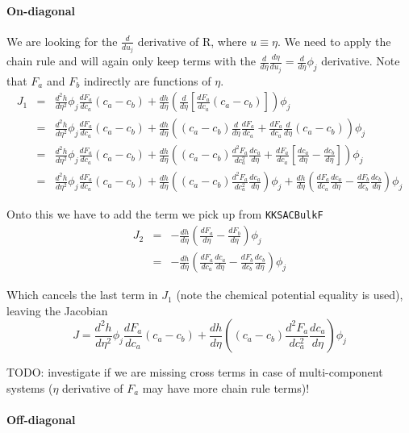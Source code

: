 \documentclass[]{article}
\begin{document}
\paragraph{On-diagonal}
We are looking for the $\frac d{du_j}$ derivative of R, where $u\equiv\eta$. We need to apply the chain rule and will again only keep terms with the $\frac{d}{d\eta}\frac{d\eta}{du_j}=\frac{d}{d\eta}\phi_j$ derivative. Note that $F_a$ and $F_b$ indirectly are functions of $\eta$.
\begin{eqnarray*}
J_1 &=& \frac{d^2h}{d\eta^2}\phi_j\frac{dF_a}{dc_a}(c_a-c_b) + \frac{dh}{d\eta}\left(\frac{d}{d\eta}\left[ \frac{dF_a}{dc_a}(c_a-c_b)\right]\right)\phi_j\\
&=& \frac{d^2h}{d\eta^2}\phi_j\frac{dF_a}{dc_a}(c_a-c_b) + \frac{dh}{d\eta}\left( (c_a-c_b)\frac{d}{d\eta}\frac{dF_a}{dc_a} + \frac{dF_a}{dc_a}\frac{d}{d\eta}(c_a-c_b) \right)\phi_j\\
&=& \frac{d^2h}{d\eta^2}\phi_j\frac{dF_a}{dc_a}(c_a-c_b) + \frac{dh}{d\eta}\left( (c_a-c_b)\frac{d^2F_a}{dc_a^2}\frac{dc_a}{d\eta} + \frac{dF_a}{dc_a}\left[\frac{dc_a}{d\eta}-\frac{dc_b}{d\eta}\right] \right)\phi_j\\
&=& \frac{d^2h}{d\eta^2}\phi_j\frac{dF_a}{dc_a}(c_a-c_b) + \frac{dh}{d\eta}\left( (c_a-c_b)\frac{d^2F_a}{dc_a^2}\frac{dc_a}{d\eta}\right)\phi_j + \frac{dh}{d\eta}\left(\frac{dF_a}{dc_a}\frac{dc_a}{d\eta}-\frac{dF_b}{dc_b}\frac{dc_b}{d\eta} \right)\phi_j
\end{eqnarray*}

Onto this we have to add the term we pick up from \texttt{KKSACBulkF}
\begin{eqnarray*}
J_2 &=& -\frac{dh}{d\eta}\left(\frac{dF_a}{d\eta}-\frac{dF_b}{d\eta}\right)\phi_j\\
&=&-\frac{dh}{d\eta}\left(\frac{dF_a}{dc_a}\frac{dc_a}{d\eta}-\frac{dF_b}{dc_b}\frac{dc_b}{d\eta}\right)\phi_j
\end{eqnarray*}

Which cancels the last term in $J_1$ (note the chemical potential equality is used), leaving the Jacobian 
\[
J=\frac{d^2h}{d\eta^2}\phi_j\frac{dF_a}{dc_a}(c_a-c_b) + \frac{dh}{d\eta}\left( (c_a-c_b)\frac{d^2F_a}{dc_a^2}\frac{dc_a}{d\eta}\right)\phi_j 
\]

TODO: investigate if we are missing cross terms in case of multi-component systems ($\eta$ derivative of $F_a$ may have more chain rule terms)!

\paragraph{Off-diagonal}
\end{document}

